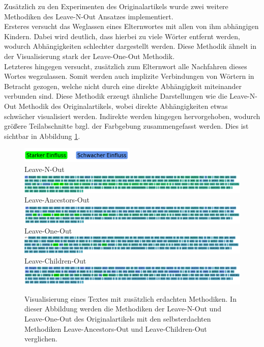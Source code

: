 \documentclass[DIV=13,fontsize=11pt]{scrartcl}
\begin{document}
Zusätzlich zu den Experimenten des Originalartikels wurde zwei weitere Methodiken des Leave-N-Out Ansatzes implementiert.\\

Ersteres versucht das Weglassen eines Elternwortes mit allen von ihm abhängigen Kindern. Dabei wird deutlich, dass
hierbei zu viele Wörter entfernt werden, wodurch Abhängigkeiten schlechter dargestellt werden. Diese Methodik
ähnelt in der Visualisierung stark der Leave-One-Out Methodik.\\

Letzteres hingegen versucht, zusätzlich zum Elternwort alle Nachfahren dieses Wortes wegzulassen. Somit werden auch
implizite Verbindungen von Wörtern in Betracht gezogen, welche nicht durch eine direkte Abhängigkeit miteinander
verbunden sind. Diese Methodik erzeugt ähnliche Darstellungen wie die Leave-N-Out Methodik des
Originalartikels, wobei direkte Abhängigkeiten etwas schwächer visualisiert werden. Indirekte werden
hingegen hervorgehoben, wodurch größere Teilabschnitte bzgl. der Farbgebung zusammengefasst werden.
Dies ist sichtbar in Abbildung \ref{fig:ex7}.

\begin{figure}[H]
    \centering
    \includegraphics[]{img/legend.png}\\
    Leave-N-Out\\
    \includegraphics[width=\linewidth]{img/own_ex_lno.png}\\
    Leave-Ancestors-Out\\
    \includegraphics[width=\linewidth]{img/own_ex_lao.png}\\
    Leave-One-Out\\
    \includegraphics[width=\linewidth]{img/own_ex_loo.png}\\
    Leave-Children-Out\\
    \includegraphics[width=\linewidth]{img/own_ex_lco.png}\\
    \caption{Visualisierung eines Textes mit zusätzlich erdachten Methodiken. In dieser Abbildung werden die Methodiken der Leave-N-Out und Leave-One-Out des Originalartikels mit den selbsterdachten Methodiken Leave-Ancestors-Out und Leave-Children-Out verglichen.}
    \label{fig:ex7}
\end{figure}
\end{document}
